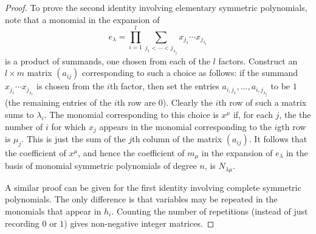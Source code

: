 \documentclass[11pt]{amsproc}
\theoremstyle{definition}
\theoremstyle{example}
\begin{document}
\begin{proof}
  To prove the second identity involving elementary symmetric polynomials, note that a monomial in the expansion of
  \begin{displaymath}
    e_\lambda = \prod_{i=1}^l \sum_{j_1<\dotsb<j_{\lambda_j}}x_{j_1}\dotsb x_{j_{\lambda_i}}
  \end{displaymath}
  is a product of summands, one chosen from each of the $l$ factors.
  Construct an $l\times m$ matrix $(a_{ij})$ corresponding to such a choice as follows:
  if the summand $x_{j_1}\dotsb x_{j_{\lambda_i}}$ is chosen from the $i$th factor, then set the entries $a_{i,j_1},\dotsc, a_{i, j_{\lambda_j}}$ to be $1$ (the remaining entries of the $i$th row are $0$).
  Clearly the $i$th row of such a matrix sums to $\lambda_i$.
  The monomial corresponding to this choice is $x^\mu$ if, for each $j$, the the number of $i$ for which $x_j$ appears in the monomial corresponding to the $i$gth row is $\mu_j$. This is just the sum of the $j$th column of the matrix $(a_{ij})$.
  It follows that the coefficient of $x^\mu$, and hence the coefficient of $m_\mu$ in the expansion of $e_\lambda$ in the basis of monomial symmetric polynomials of degree $n$, is $N_{\lambda\mu}$.

A similar proof can be given for the first identity involving complete symmetric polynomials. The only difference is that variables may be repeated in the monomials that appear in $h_i$. Counting the number of repetitions (instead of just recording $0$ or $1$) gives non-negative integer matrices.
\end{proof}
\end{document}
